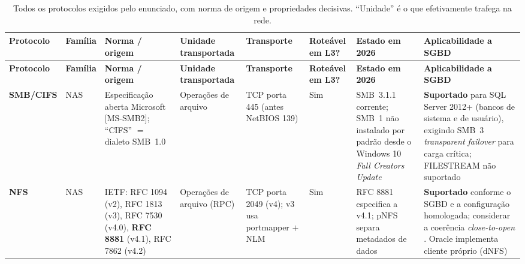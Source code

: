 \documentclass[11pt,a4paper]{article}
\begin{document}
\begin{landscape}\thispagestyle{empty}
{\scriptsize \setlength{\tabcolsep}{3.5pt} \renewcommand{\arraystretch}{1.25}
\begin{longtable}{@{}>{\RaggedRight\arraybackslash}p{1.85cm}
                    >{\RaggedRight\arraybackslash}p{1.15cm}
                    >{\RaggedRight\arraybackslash}p{3.0cm}
                    >{\RaggedRight\arraybackslash}p{2.35cm}
                    >{\RaggedRight\arraybackslash}p{2.75cm}
                    >{\RaggedRight\arraybackslash}p{1.5cm}
                    >{\RaggedRight\arraybackslash}p{2.4cm}
                    >{\RaggedRight\arraybackslash}p{5.5cm}@{}}
\caption{Todos os protocolos exigidos pelo enunciado, com norma de origem e propriedades
decisivas. ``Unidade'' é o que efetivamente trafega na rede.}
\label{tab:protocolos}\\
\toprule
\textbf{Protocolo} & \textbf{Família} & \textbf{Norma / origem} & \textbf{Unidade transportada} &
\textbf{Transporte} & \textbf{Roteável em L3?} & \textbf{Estado em 2026} &
\textbf{Aplicabilidade a SGBD} \\
\midrule
\endfirsthead
\toprule
\textbf{Protocolo} & \textbf{Família} & \textbf{Norma / origem} & \textbf{Unidade transportada} &
\textbf{Transporte} & \textbf{Roteável em L3?} & \textbf{Estado em 2026} &
\textbf{Aplicabilidade a SGBD} \\
\midrule
\endhead
\bottomrule
\endfoot

\textbf{SMB/CIFS} & NAS & Especificação aberta Microsoft [MS-SMB2]; ``CIFS'' $=$ dialeto SMB~1.0
& Operações de arquivo & TCP porta 445 (antes NetBIOS 139) & Sim & SMB~3.1.1 corrente; SMB~1 não
instalado por padrão desde o Windows 10 \textit{Fall Creators Update} \cite{mssmb1} &
\textbf{Suportado} para SQL Server 2012+ (bancos de sistema e de usuário), exigindo SMB~3
\textit{transparent failover} para carga crítica; FILESTREAM não suportado \cite{mssqlsmb} \\

\textbf{NFS} & NAS & IETF: RFC 1094 (v2), RFC 1813 (v3), RFC 7530 (v4.0), \textbf{RFC 8881} (v4.1),
RFC 7862 (v4.2) & Operações de arquivo (RPC) & TCP porta 2049 (v4); v3 usa portmapper $+$ NLM &
Sim & RFC 8881 especifica a v4.1; pNFS separa metadados de dados \cite{rfc8881} & \textbf{Suportado}
conforme o SGBD e a configuração homologada; considerar a coerência
\textit{close-to-open} \cite{nfsman}. Oracle implementa cliente próprio (dNFS) \cite{oracledn} \\


\end{longtable}}
\end{landscape}
\end{document}
